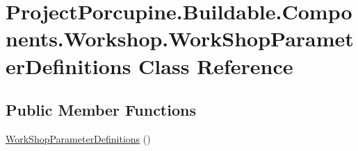\hypertarget{class_project_porcupine_1_1_buildable_1_1_components_1_1_workshop_1_1_work_shop_parameter_definitions}{}\section{Project\+Porcupine.\+Buildable.\+Components.\+Workshop.\+Work\+Shop\+Parameter\+Definitions Class Reference}
\label{class_project_porcupine_1_1_buildable_1_1_components_1_1_workshop_1_1_work_shop_parameter_definitions}
\subsection*{Public Member Functions}
\begin{DoxyCompactItemize}
\item 
\hyperlink{class_project_porcupine_1_1_buildable_1_1_components_1_1_workshop_1_1_work_shop_parameter_definitions_a277735bda1489f5268f0ae58956ece1a}{Work\+Shop\+Parameter\+Definitions} ()
\end{DoxyCompactItemize}
